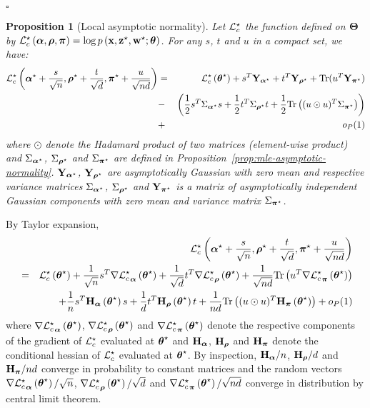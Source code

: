 \documentclass[]{imsart}
\newcommand{\1}{\mathds{1}}
\numberwithin{equation}{section}
\theoremstyle{plain}
\newtheorem{proposition}[thm]{Proposition}
\theoremstyle{remark}
\begin{document}
\begin{flushright}
$\square$
\end{flushright}

\begin{proposition}[Local asymptotic normality]\label{prop:LocalAsymp}
Let $\mathcal{L}_c^{\star}$ the function defined on $\boldsymbol{\Theta}$ by $\mathcal{L}_c^{\star}\left(\boldsymbol{\alpha},\boldsymbol{\rho},\boldsymbol{\pi}\right)=\log p\left(\mathbf{x},\mathbf{z}^\star,\mathbf{w}^\star;\boldsymbol{\theta}\right)$. For any $s$, $t$ and $u$ in a compact set, we have:
\begin{eqnarray*}
\Lcs\left(\bpis+\frac{s}{\sqrt{\n}},\brhos+\frac{t}{\sqrt{\dd}},\bals+\frac{u}{\sqrt{\n\dd}}\right)
&=&\Lcs\left(\bthetas\right) + s\transpose\bY_{\bpis}+t\transpose\bY_{\brhos}+ \text{Tr}(u\transpose\bY_{\bals})\\
& -&\left(\frac{1}{2}s\transpose\Sig_{\bpis}s+\frac{1}{2}t\transpose\Sig_{\brhos}t+\frac{1}{2} \text{Tr}\left((u \odot u)\transpose\Sig_{\bals}\right)\right)\\
&+&o_{P}(1)\\
\end{eqnarray*}
where $\odot$ denote the Hadamard product of two matrices (element-wise product) and $\Sigma_{\boldsymbol{\alpha}^\star}$, $\Sigma_{\boldsymbol{\rho}^\star}$ and $\Sigma_{\boldsymbol{\pi}^\star}$ are defined in Proposition~\ref{prop:mle-asymptotic-normality}. $\mathbf{Y}_{\boldsymbol{\alpha}^\star}$, $\mathbf{Y}_{\boldsymbol{\rho}^\star}$ are asymptotically Gaussian with zero mean and respective variance matrices $\Sigma_{\boldsymbol{\alpha}^\star}$, $\Sigma_{\boldsymbol{\rho}^\star}$ and $\mathbf{Y}_{\boldsymbol{\pi}^\star}$ is a matrix of asymptotically independent Gaussian components with zero mean and variance matrix $\Sigma_{\boldsymbol{\pi}^\star}$.
\end{proposition}
\proofbegin
By Taylor expansion,
\begin{eqnarray*}
& &\!\!\!\!\!\!\!\!\!\!\Lcs\left(\bpis+\frac{s}{\sqrt{\n}},\brhos+\frac{t}{\sqrt{\dd}},\bals+\frac{u}{\sqrt{\n\dd}}\right)\\
&=&\Lcs\left(\bthetas\right)+\frac{1}{\sqrt{\n}}s\transpose\nabla{\Lcs}_{\bpi}\left(\bthetas\right) +\frac{1}{\sqrt{\dd}}t\transpose\nabla{\Lcs}_{\brho}\left(\bthetas\right)+\frac{1}{\sqrt{\n\dd}}\text{Tr}\left(u\transpose\nabla{\Lcs}_{\bal}\left(\bthetas\right)\right)\\
&&\quad+\frac{1}{\n}s\transpose\bH_{\bpi}\left(\bthetas\right)s+\frac{1}{\dd}t\transpose\bH_{\brho}\left(\bthetas\right)t +\frac{1}{\n\dd}\text{Tr}\left((u \odot u)\transpose\bH_{\bal}\left(\bthetas\right)\right)+o_{P}(1)\\
\end{eqnarray*}
where $\nabla{\mathcal{L}_c^{\star}}_{\boldsymbol{\alpha}}\left(\boldsymbol{\theta}^\star\right)$, $\nabla{\mathcal{L}_c^{\star}}_{\boldsymbol{\rho}}\left(\boldsymbol{\theta}^\star\right)$ and $\nabla{\mathcal{L}_c^{\star}}_{\boldsymbol{\pi}}\left(\boldsymbol{\theta}^\star\right)$ denote the respective components of the gradient of $\mathcal{L}_c^{\star}$ evaluated at $\boldsymbol{\theta}^\star$ and $\mathbf{H}_{\boldsymbol{\alpha}}$, $\mathbf{H}_{\boldsymbol{\rho}}$ and $\mathbf{H}_{\boldsymbol{\pi}}$ denote the conditional hessian of $\mathcal{L}_c^{\star}$ evaluated at $\boldsymbol{\theta}^\star$. By inspection, $\mathbf{H}_{\boldsymbol{\alpha}}/n$, $\mathbf{H}_{\boldsymbol{\rho}}/d$ and $\mathbf{H}_{\boldsymbol{\pi}}/nd$ converge in probability to constant matrices and the random vectors $\nabla{\mathcal{L}_c^{\star}}_{\boldsymbol{\alpha}}\left(\boldsymbol{\theta}^\star\right)/\sqrt{n}$, $\nabla{\mathcal{L}_c^{\star}}_{\boldsymbol{\rho}}\left(\boldsymbol{\theta}^\star\right)/\sqrt{d}$ and $\nabla{\mathcal{L}_c^{\star}}_{\boldsymbol{\pi}}\left(\boldsymbol{\theta}^\star\right)/\sqrt{nd}$ converge in distribution by central limit theorem. %
\proofend
\end{document}
